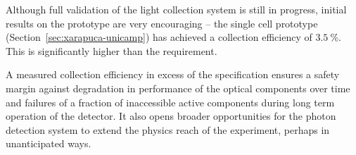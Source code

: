 Although full validation of the   light collection system is still in progress, initial results on the  prototype are very encouraging -- the single cell prototype (Section~\ref{sec:xarapuca-unicamp}) has achieved a collection efficiency of $\SI{3.5}{\%}$.  This is significantly higher than the requirement.

A measured collection efficiency in excess of the specification ensures a safety margin against degradation in performance of the optical components over time and failures of a fraction of inaccessible active components during long term operation of the detector. It also opens broader opportunities for the photon detection system to extend the physics reach of the experiment, perhaps in unanticipated ways.

